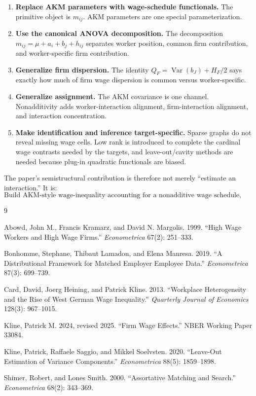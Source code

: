\documentclass[11pt]{article}
\newcommand{\Var}{\operatorname{Var}}
\begin{document}
\begin{enumerate}
\item \textbf{Replace AKM parameters with wage-schedule functionals.}
The primitive object is \(m_{ij}\). AKM parameters are one special
parameterization.

\item \textbf{Use the canonical ANOVA decomposition.}
The decomposition \(m_{ij}=\mu+a_i+b_j+h_{ij}\) separates worker position,
common firm contribution, and worker-specific firm contribution.

\item \textbf{Generalize firm dispersion.}
The identity \(Q_F=\Var(b_J)+H_F/2\) says exactly how much of firm wage
dispersion is common versus worker-specific.

\item \textbf{Generalize assignment.}
The AKM covariance is one channel. Nonadditivity adds worker-interaction
alignment, firm-interaction alignment, and interaction concentration.

\item \textbf{Make identification and inference target-specific.}
Sparse graphs do not reveal missing wage cells. Low rank is introduced to
complete the cardinal wage contrasts needed by the targets, and leave-out/cavity
methods are needed because plug-in quadratic functionals are biased.
\end{enumerate}

The paper's semistructural contribution is therefore not merely ``estimate an
interaction.'' It is:
\[
\boxed{
\text{Build AKM-style wage-inequality accounting for a nonadditive wage schedule,
with graph-aware identification and bias-corrected inference.}
}
\]

\begin{thebibliography}{9}

Abowd, John M., Francis Kramarz, and David N. Margolis. 1999. ``High Wage
Workers and High Wage Firms.'' \emph{Econometrica} 67(2): 251--333.

Bonhomme, Stephane, Thibaut Lamadon, and Elena Manresa. 2019. ``A
Distributional Framework for Matched Employer Employee Data.''
\emph{Econometrica} 87(3): 699--739.

Card, David, Joerg Heining, and Patrick Kline. 2013. ``Workplace Heterogeneity
and the Rise of West German Wage Inequality.'' \emph{Quarterly Journal of
Economics} 128(3): 967--1015.

Kline, Patrick M. 2024, revised 2025. ``Firm Wage Effects.'' NBER Working Paper
33084.

Kline, Patrick, Raffaele Saggio, and Mikkel Soelvsten. 2020. ``Leave-Out
Estimation of Variance Components.'' \emph{Econometrica} 88(5): 1859--1898.

Shimer, Robert, and Lones Smith. 2000. ``Assortative Matching and Search.''
\emph{Econometrica} 68(2): 343--369.

\end{thebibliography}
\end{document}
